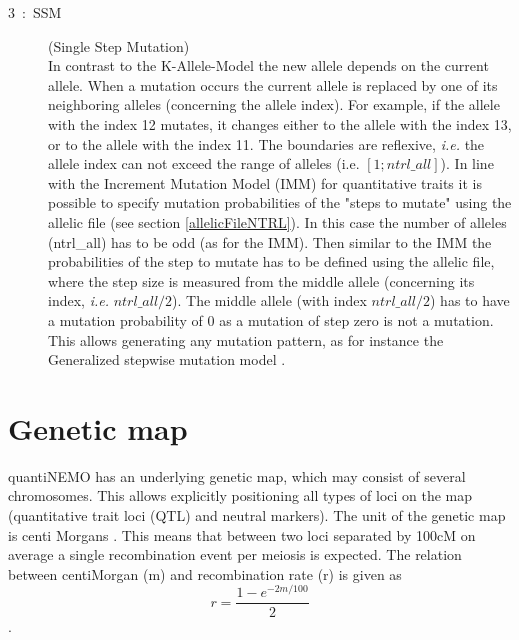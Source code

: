 \documentclass[letterpaper,12pt,oneside]{book}
\begin{document}
\begin{description}
\begin{description}
\item[3~:~SSM] (Single Step Mutation)\\
In contrast to the K-Allele-Model the new allele depends on the current allele. When a mutation occurs the current allele is replaced by one of its neighboring alleles (concerning the allele index). For example, if the allele with the index 12 mutates, it changes either to the allele with the index 13, or to the allele with the index 11. The boundaries are reflexive, \textit{i.e.} the allele index can not exceed the range of alleles (i.e. $[1; ntrl\_all]$). In line with the Increment Mutation Model (IMM) for quantitative traits it is possible to specify mutation probabilities of the "steps to mutate" using the allelic file (see section \ref{allelicFileNTRL}). In this case the number of alleles (\textsf{ntrl\_all}) has to be odd (as for the IMM). Then similar to the IMM the probabilities of the step to mutate has to be defined using the allelic file, where the step size is measured from the middle allele (concerning its index, \textit{i.e.} $ntrl\_all/2$). The middle allele (with index $ntrl\_all/2$) has to have a mutation probability of 0 as a mutation of step zero is not a mutation. This allows generating any mutation pattern, as for instance the Generalized stepwise mutation model \citep{Estoup_2002}.
\end{description}
\end{description}


\section{Genetic map}\label{sec:geneticMap}
quantiNEMO has an underlying genetic map, which may consist of several chromosomes. This allows
explicitly positioning all types of loci on the map (quantitative trait loci (QTL) and neutral
markers). The unit of the genetic map is centi Morgans \citep[cM]{Haldane_1919}. This means that
between two loci separated by 100cM on average a single recombination event per meiosis is expected.
The relation between centiMorgan (m) and recombination rate (r) is given as 
\[r=\frac{1-e^{-2m/100}}{2}\].
\end{document}
